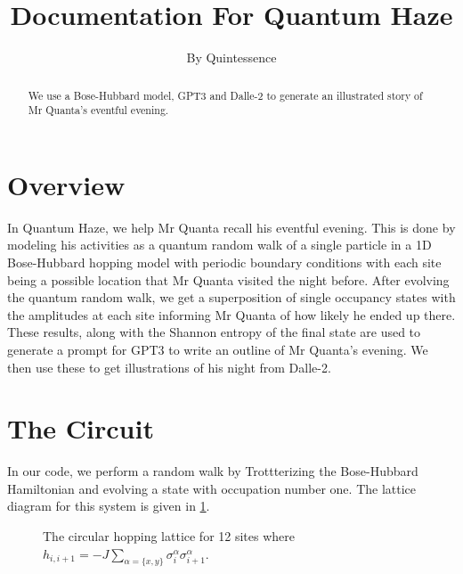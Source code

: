 \documentclass[11pt]{article}
\title{Documentation For Quantum Haze}
\author{By Quintessence}
\begin{document}
  \maketitle
  \begin{abstract}
    We use a Bose-Hubbard model, GPT3 and Dalle-2 to generate an illustrated story of Mr Quanta's eventful evening. 
  \end{abstract}
  \tableofcontents
  \section{Overview}
    In Quantum Haze, we help Mr Quanta recall his eventful evening. This is done by modeling his activities as a quantum random walk of a single particle in a 1D Bose-Hubbard hopping model with periodic boundary conditions with each site being a possible location that Mr Quanta visited the night before. After evolving the quantum random walk, we get a superposition of single occupancy states with the amplitudes at each site informing Mr Quanta of how likely he ended up there. These results, along with the  Shannon entropy of the final state are used to generate a prompt for GPT3 to write an outline of Mr Quanta's evening. We then use these to get illustrations of his night from Dalle-2. 
  \section{The Circuit}
    In our code, we  perform a random walk by Trottterizing the Bose-Hubbard Hamiltonian and evolving a state with occupation number one. The lattice diagram for this system is given in \ref{fig:Lattice}.
    \begin{figure}[h]
      \centering
      \caption{The circular hopping lattice for 12 sites where $h_{i,i+1} = -J\sum\limits_{\alpha=\{x,y\}}\sigma_i^\alpha\sigma^\alpha_{i+1}$.}\label{fig:Lattice}
    \end{figure}
\end{document}
